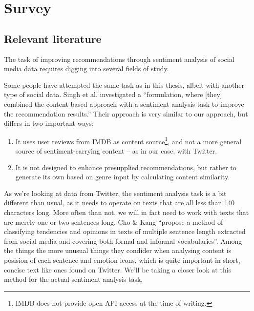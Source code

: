 
\chapter{Survey} %

\label{Chapter2} %




\section{Relevant literature} %
\label{sec:relevant_literature}

The task of improving recommendations through sentiment analysis of social media data requires digging into several fields of study.

Some people have attempted the same task as in this thesis, albeit with another type of social data.
Singh et al. \cite{Singh2011} investigated a ``formulation, where [they] combined the content-based approach with a sentiment analysis task to improve the recommendation results.''
Their approach is very similar to our approach, but differs in two important ways:
\begin{enumerate}
  \item It uses user reviews from IMDB as content source\footnote{IMDB does not provide open API access at the time of writing.}, and not a more general source of sentiment-carrying content -- as in our case, with Twitter.
  \item It is not designed to enhance presupplied recommendations, but rather to generate its own based on genre input by calculating content similarity.
\end{enumerate}

As we're looking at data from Twitter, the sentiment analysis task is a bit different than usual, as it needs to operate on texts that are all less than 140 characters long. More often than not, we will in fact need to work with texts that are merely one or two sentences long.
Cho \& Kang \cite{ChoKang2012} ``propose a method of classifying tendencies and opinions in texts of multiple sentence length extracted from social media and covering both formal and informal vocabularies''.
Among the things the more unusual things they condider when analysing content is posision of each sentence and emotion icons, which is quite important in short, concise text like ones found on Twitter.
We'll be taking a closer look at this method for the actual sentiment analysis task.


